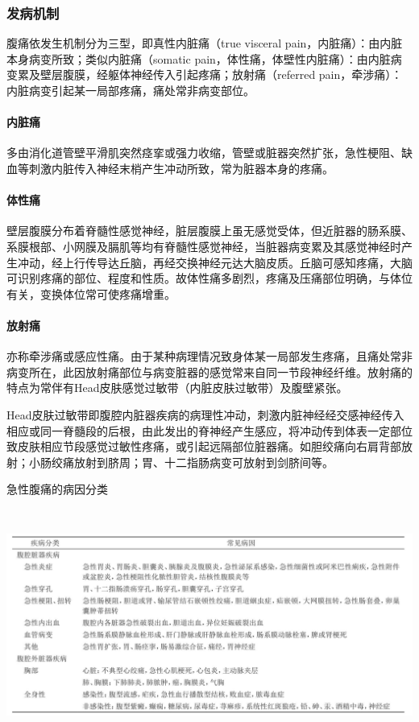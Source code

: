 \subsubsection{发病机制}

腹痛依发生机制分为三型，即真性内脏痛（true visceral
pain，内脏痛）：由内脏本身病变所致；类似内脏痛（somatic
pain，体性痛，体壁性内脏痛）：由内脏病变累及壁层腹膜，经躯体神经传入引起疼痛；放射痛（referred
pain，牵涉痛）：内脏病变引起某一局部疼痛，痛处常非病变部位。

\paragraph{内脏痛}

多由消化道管壁平滑肌突然痉挛或强力收缩，管壁或脏器突然扩张，急性梗阻、缺血等刺激内脏传入神经末梢产生冲动所致，常为脏器本身的疼痛。

\paragraph{体性痛}

壁层腹膜分布着脊髓性感觉神经，脏层腹膜上虽无感觉受体，但近脏器的肠系膜、系膜根部、小网膜及膈肌等均有脊髓性感觉神经，当脏器病变累及其感觉神经时产生冲动，经上行传导达丘脑，再经交换神经元达大脑皮质。丘脑可感知疼痛，大脑可识别疼痛的部位、程度和性质。故体性痛多剧烈，疼痛及压痛部位明确，与体位有关，变换体位常可使疼痛增重。

\paragraph{放射痛}

亦称牵涉痛或感应性痛。由于某种病理情况致身体某一局部发生疼痛，且痛处常非病变所在，此因放射痛部位与病变脏器的感觉常来自同一节段神经纤维。放射痛的特点为常伴有Head皮肤感觉过敏带（内脏皮肤过敏带）及腹壁紧张。

Head皮肤过敏带即腹腔内脏器疾病的病理性冲动，刺激内脏神经经交感神经传入相应或同一脊髓段的后根，由此发出的脊神经产生感应，将冲动传到体表一定部位致皮肤相应节段感觉过敏性疼痛，或引起远隔部位脏器痛。如胆绞痛向右肩背部放射；小肠绞痛放射到脐周；胃、十二指肠病变可放射到剑脐间等。

\begin{table}[htbp]
\centering
\caption{急性腹痛的病因分类}
\label{tab10-1}
\includegraphics[width=6.67708in,height=3in]{./images/Image00050.jpg}
\end{table}

